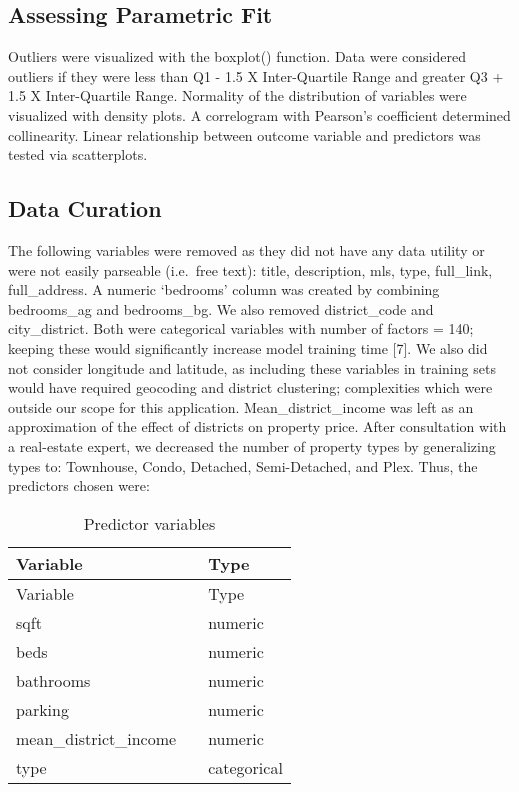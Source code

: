 \documentclass[11pt,]{article}
\begin{document}
\hypertarget{assessing-parametric-fit}{%
\subsection{Assessing Parametric Fit}\label{assessing-parametric-fit}}

Outliers were visualized with the boxplot() function. Data were
considered outliers if they were less than Q1 - 1.5 X Inter-Quartile
Range and greater Q3 + 1.5 X Inter-Quartile Range. Normality of the
distribution of variables were visualized with density plots. A
correlogram with Pearson's coefficient determined collinearity. Linear
relationship between outcome variable and predictors was tested via
scatterplots.

\hypertarget{data-curation}{%
\subsection{Data Curation}\label{data-curation}}

The following variables were removed as they did not have any data
utility or were not easily parseable (i.e.~free text): title,
description, mls, type, full\_link, full\_address. A numeric `bedrooms'
column was created by combining bedrooms\_ag and bedrooms\_bg. We also
removed district\_code and city\_district. Both were categorical
variables with number of factors = 140; keeping these would
significantly increase model training time {[}7{]}. We also did not
consider longitude and latitude, as including these variables in
training sets would have required geocoding and district clustering;
complexities which were outside our scope for this application.
Mean\_district\_income was left as an approximation of the effect of
districts on property price. After consultation with a real-estate
expert, we decreased the number of property types by generalizing types
to: Townhouse, Condo, Detached, Semi-Detached, and Plex. Thus, the
predictors chosen were:

\begin{longtable}[]{@{}lll@{}}
\caption{Predictor variables}\tabularnewline
\toprule
Variable & & Type\tabularnewline
\midrule
\endfirsthead
\toprule
Variable & & Type\tabularnewline
\midrule
\endhead
sqft & & numeric\tabularnewline
beds & & numeric\tabularnewline
bathrooms & & numeric\tabularnewline
parking & & numeric\tabularnewline
mean\_district\_income & & numeric\tabularnewline
type & & categorical\tabularnewline
\bottomrule
\end{longtable}
\end{document}
